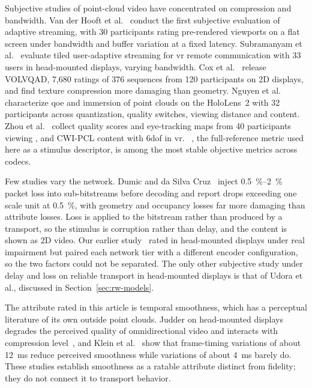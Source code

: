 Subjective studies of point-cloud video have concentrated on
compression and bandwidth. Van der Hooft et al.~\cite{vanderhooft2020qomex}
conduct the first subjective evaluation of adaptive \vpcc streaming,
with 30 participants rating pre-rendered viewports on a flat screen
under bandwidth and buffer variation at a fixed latency. Subramanyam
et al.~\cite{subramanyam2022} evaluate tiled user-adaptive streaming
for \gls{vr} remote communication with 33 users in head-mounted
displays, varying bandwidth. Cox et al.~\cite{Cox2023} release VOLVQAD,
7,680 ratings of 376 \vpcc sequences from 120 participants on 2D
displays, and find texture compression more damaging than geometry.
Nguyen et al.~\cite{nguyen2023} characterize \gls{qoe} and immersion of
\vpcc point clouds on the HoloLens~2 with 32 participants across
quantization, quality switches, viewing distance and content. Zhou et
al.~\cite{zhou2025tomm} collect quality scores and eye-tracking maps
from 40 participants viewing \vpcc, \gpcc and CWI-PCL content with
\gls{6dof} in \gls{vr}. \pcqm~\cite{pcqm}, the full-reference metric
used here as a stimulus descriptor, is among the most stable objective
metrics across codecs.

Few studies vary the network. Dumic and da Silva Cruz~\cite{dumic2023}
inject \SIrange{0.5}{2}{\percent} packet loss into \vpcc sub-bitstreams
before decoding and report \mos drops exceeding one scale unit at
\SI{0.5}{\percent}, with geometry and occupancy losses far more
damaging than attribute losses. Loss is applied to the bitstream
rather than produced by a transport, so the stimulus is
corruption rather than delay, and the content is shown as 2D video.
Our earlier study~\cite{mosaic2026} rated \vpcc in head-mounted
displays under real \quic impairment but paired each network tier with
a different encoder configuration, so the two factors could not be
separated. The only other subjective study under delay and loss on
reliable transport in head-mounted displays is that of Udora et al.,
discussed in Section~\ref{sec:rw-models}.

The attribute rated in this article is temporal smoothness, which has
a perceptual literature of its own outside point clouds. Judder on
head-mounted displays degrades the perceived quality of
omnidirectional video and interacts with compression
level~\cite{mahmoudpour2019judder}, and Klein et
al.~\cite{klein2024vft} show that frame-timing variations of about
\SI{12}{\milli\second} reduce perceived smoothness while variations of
about \SI{4}{\milli\second} barely do. These studies establish
smoothness as a ratable attribute distinct from fidelity; they do not
connect it to transport behavior.

